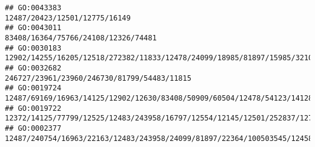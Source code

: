 \documentclass[
]{article}
\begin{document}
\begin{verbatim}
## GO:0043383                                                                                                                                                                                                                                                                                                                                                                                12487/20423/12501/12775/16149
## GO:0043011                                                                                                                                                                                                                                                                                                                                                                          83408/16364/75766/24108/12326/74481
## GO:0030183                                                                                                                                                                                                                                                                                                                  12902/14255/16205/12518/272382/11833/12478/24099/18985/81897/15985/321019/12482/16186/12229
## GO:0032682                                                                                                                                                                                                                                                                                                                                                                  246727/23961/23960/246730/81799/54483/11815
## GO:0019724                                                                                                                                                                                                                                                                                12487/69169/16963/14125/12902/12630/83408/50909/60504/12478/54123/14128/16160/16185/12458/14998/12268/12263/16149/20371/12229
## GO:0019722                                                                                                                                                                                                                                                                                          12372/14125/77799/12525/12483/243958/16797/12554/12145/12501/252837/12773/23832/12775/12777/21943/12458/53901/12766
## GO:0002377                                                                                                                                                                                                                                                                                                                    12487/240754/16963/22163/12483/243958/24099/81897/22364/100503545/12458/69816/20371/12229

\end{verbatim}
\end{document}
